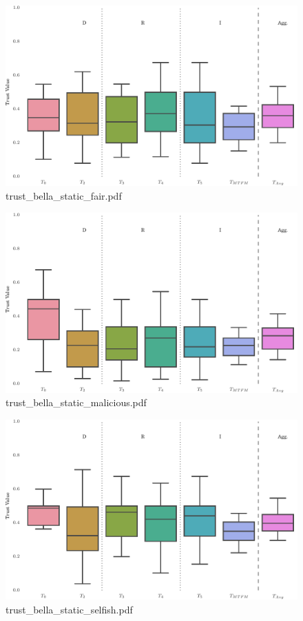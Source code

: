 \documentclass{article}
\begin{document}
\begin{figure}[h!]
\centering
\includegraphics[width=\linewidth]{trust_bella_static_fair.pdf}
\caption{trust\_bella\_static\_fair.pdf}
\end{figure}




\begin{figure}[h!]
\centering
\includegraphics[width=\linewidth]{trust_bella_static_malicious.pdf}
\caption{trust\_bella\_static\_malicious.pdf}
\end{figure}




\begin{figure}[h!]
\centering
\includegraphics[width=\linewidth]{trust_bella_static_selfish.pdf}
\caption{trust\_bella\_static\_selfish.pdf}
\end{figure}
\end{document}
